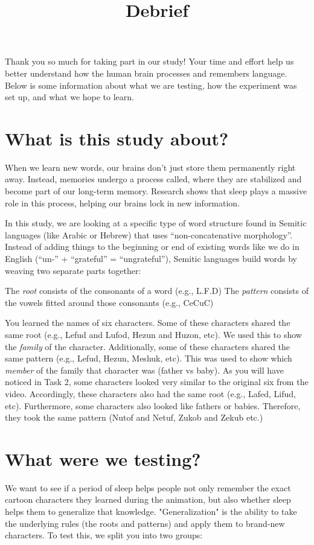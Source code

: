 \documentclass[12pt]{article}
\title{Debrief}
\begin{document}
\maketitle

Thank you so much for taking part in our study! Your time and effort help us better understand how the human brain processes and remembers language. Below is some information about what we are testing, how the experiment was set up, and what we hope to learn.

\section{What is this study about?}
When we learn new words, our brains don't just store them permanently right away. Instead, memories undergo a process called, where they are stabilized and become part of our long-term memory. Research shows that sleep plays a massive role in this process, helping our brains lock in new information.

In this study, we are looking at a specific type of word structure found in Semitic languages (like Arabic or Hebrew) that uses \enquote{non-concatenative morphology}. Instead of adding things to the beginning or end of existing words like we do in English (\enquote{un-} + \enquote{grateful} = \enquote{ungrateful}), Semitic languages build words by weaving two separate parts together:

    \ex The \textit{root} consists of the consonants of a word (e.g., L.F.D)\xe
    \ex The \textit{pattern} consists of the vowels fitted around those consonants (e.g., CeCuC)\xe

You learned the names of six characters. Some of these characters shared the same root (e.g., Lefud and Lufod, Hezun and Huzon, etc). We used this to show the \textit{family} of the character. Additionally, some of these characters shared the same pattern (e.g., Lefud, Hezun, Meshuk, etc). This was used to show which \textit{member} of the family that character was (father vs baby). As you will have noticed in Task 2, some characters looked very similar to the original six from the video. Accordingly, these characters also had the same root (e.g., Lafed, Lifud, etc). Furthermore, some characters also looked like fathers or babies. Therefore, they took the same pattern (Nutof and Netuf, Zukob and Zekub etc.)

\section{What were we testing?}
We want to see if a period of sleep helps people not only remember the exact cartoon characters they learned during the animation, but also whether sleep helps them to generalize that knowledge. "Generalization" is the ability to take the underlying rules (the roots and patterns) and apply them to brand-new characters. To test this, we split you into two groups:
\end{document}
